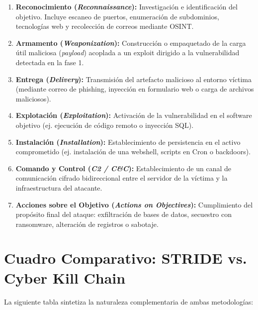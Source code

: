 \begin{enumerate}
    \item \textbf{Reconocimiento (\textit{Reconnaissance}):} Investigación e identificación del objetivo. Incluye escaneo de puertos, enumeración de subdominios, tecnologías web y recolección de correos mediante OSINT.
    \item \textbf{Armamento (\textit{Weaponization}):} Construcción o empaquetado de la carga útil maliciosa (\textit{payload}) acoplada a un exploit dirigido a la vulnerabilidad detectada en la fase 1.
    \item \textbf{Entrega (\textit{Delivery}):} Transmisión del artefacto malicioso al entorno víctima (mediante correo de phishing, inyección en formulario web o carga de archivos maliciosos).
    \item \textbf{Explotación (\textit{Exploitation}):} Activación de la vulnerabilidad en el software objetivo (ej. ejecución de código remoto o inyección SQL).
    \item \textbf{Instalación (\textit{Installation}):} Establecimiento de persistencia en el activo comprometido (ej. instalación de una webshell, scripts en Cron o backdoors).
    \item \textbf{Comando y Control (\textit{C2 / C\&C}):} Establecimiento de un canal de comunicación cifrado bidireccional entre el servidor de la víctima y la infraestructura del atacante.
    \item \textbf{Acciones sobre el Objetivo (\textit{Actions on Objectives}):} Cumplimiento del propósito final del ataque: exfiltración de bases de datos, secuestro con ransomware, alteración de registros o sabotaje.
\end{enumerate}

\section{Cuadro Comparativo: STRIDE vs. Cyber Kill Chain}
La siguiente tabla sintetiza la naturaleza complementaria de ambas metodologías:

